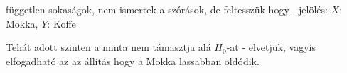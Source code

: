 független sokaságok, nem ismertek a szórások, de feltesszük hogy
. jelölés: $X:$ Mokka, $Y$: Koffe

Tehát adott szinten a minta nem támasztja alá $H_0$-at - elvetjük, vagyis
elfogadható az az állítás hogy a Mokka lassabban oldódik.
